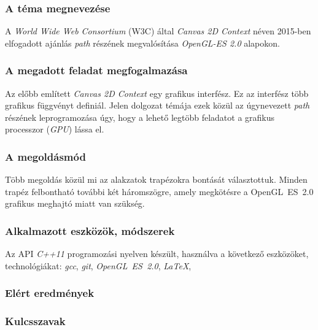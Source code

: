 \documentclass[12pt]{report}
\theoremstyle{definition}
\begin{document}

    \subsubsection*{A téma megnevezése}

A \emph{World Wide Web Consortium} (W3C) által \emph{Canvas 2D Context} néven
2015-ben elfogadott ajánlás \emph{path} részének megvalósítása \emph{OpenGL-ES
2.0} alapokon.

    \subsubsection*{A megadott feladat megfogalmazása}

Az előbb említett \emph{Canvas 2D Context} egy grafikus interfész. Ez az
interfész több grafikus függvényt definiál. Jelen dolgozat témája ezek közül az
úgynevezett \emph{path} részének leprogramozása úgy, hogy a lehető legtöbb
feladatot a grafikus processzor (\textit{GPU}) lássa el.

    \subsubsection*{A megoldásmód}

Több megoldás közül mi az alakzatok trapézokra bontását választottuk. Minden
trapéz felbontható további két háromszögre, amely megkötésre a OpenGL~ES~2.0
grafikus meghajtó miatt van szükség.

    \subsubsection*{Alkalmazott eszközök, módszerek}

Az API \emph{C++11} programozási nyelven készült, használva a következő
eszközöket, technológiákat: \emph{gcc}, \emph{git}, \textit{OpenGL~ES~2.0},
\emph{\LaTeX},

    \subsubsection*{Elért eredmények}

    \subsubsection*{Kulcsszavak}
\end{document}
